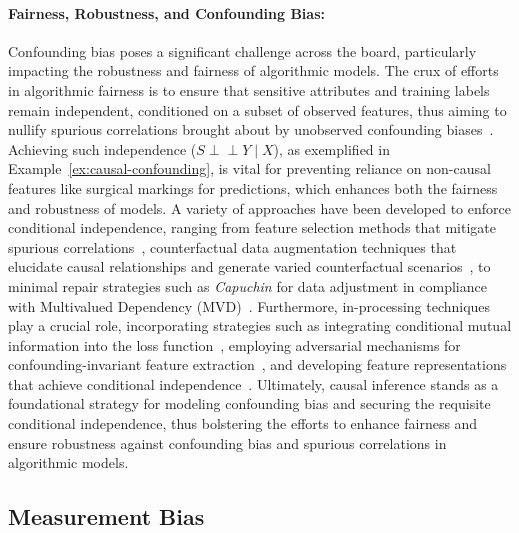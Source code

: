 \documentclass[11pt]{article}
\newcommand{\indep}{\mbox{$\perp\!\!\!\perp$}}
\begin{document}
\vspace{-0.8cm}
\paragraph{Fairness, Robustness, and Confounding Bias:} Confounding bias poses a significant challenge across the board, particularly impacting the robustness and fairness of algorithmic models. The crux of efforts in algorithmic fairness is to ensure that sensitive attributes and training labels remain independent, conditioned on a subset of observed features, thus aiming to nullify spurious correlations brought about by unobserved confounding biases~\cite{salimi2019capuchin,galhotra2022causal,ma2023learning}. Achieving such independence (\(S \indep Y \mid X\)), as exemplified in Example~\ref{ex:causal-confounding}, is vital for preventing reliance on non-causal features like surgical markings for predictions, which enhances both the fairness and robustness of models. A variety of approaches have been developed to enforce conditional independence, ranging from feature selection methods that mitigate spurious correlations~\cite{galhotra2022causal}, counterfactual data augmentation techniques that elucidate causal relationships and generate varied counterfactual scenarios~\cite{ma2023learning}, to minimal repair strategies such as \textit{Capuchin} for data adjustment in compliance with Multivalued Dependency (MVD)~\cite{salimi2019capuchin}. Furthermore, in-processing techniques play a crucial role, incorporating strategies such as integrating conditional mutual information into the loss function~\cite{seo2022information}, employing adversarial mechanisms for confounding-invariant feature extraction~\cite{zhao2020training}, and developing feature representations that achieve conditional independence~\cite{xu2020algorithmic}. Ultimately, causal inference stands as a foundational strategy for modeling confounding bias and securing the requisite conditional independence, thus bolstering the efforts to enhance fairness and ensure robustness against confounding bias and spurious correlations in algorithmic models.

\vspace{-0.4cm}
\subsection{Measurement Bias}
\vspace{-.15cm}
\end{document}
